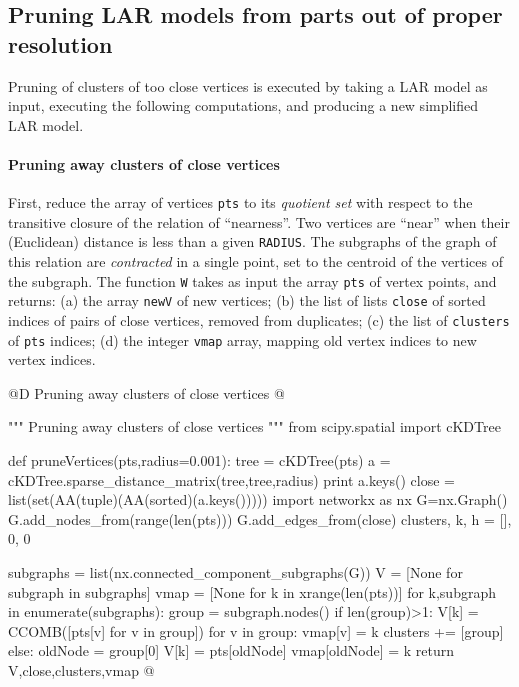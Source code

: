 \documentclass[11pt,oneside]{article}    %
\begin{document}
\subsection{Pruning LAR models from parts out of proper resolution}

Pruning of clusters of too close vertices is executed by taking a LAR model as input, 
executing the following computations, and producing a new simplified LAR model.

\paragraph{Pruning away clusters of close vertices}
First, reduce the array of vertices \texttt{pts} to its \emph{quotient set} with respect to the transitive closure of the relation of ``nearness''. Two vertices are ``near'' when their (Euclidean) distance is less than a given \texttt{RADIUS}. The subgraphs of the graph of this relation are \emph{contracted} in a single point, set to the centroid of the vertices of the subgraph. The function \texttt{W} takes as input the array \texttt{pts} of vertex points, and returns: (a) the array \texttt{newV} of new vertices; (b) the list of lists \texttt{close} of sorted indices of pairs of close vertices, removed from duplicates; (c) the list of \texttt{clusters} of \texttt{pts} indices; (d) the integer  \texttt{vmap} array, mapping old vertex indices to new vertex indices.

@D Pruning away clusters of close vertices
@{""" Pruning away clusters of close vertices """
from scipy.spatial import cKDTree

def pruneVertices(pts,radius=0.001):
    tree = cKDTree(pts)
    a = cKDTree.sparse_distance_matrix(tree,tree,radius)
    print a.keys()
    close = list(set(AA(tuple)(AA(sorted)(a.keys()))))
    import networkx as nx
    G=nx.Graph()
    G.add_nodes_from(range(len(pts)))
    G.add_edges_from(close)
    clusters, k, h = [], 0, 0
    
    subgraphs = list(nx.connected_component_subgraphs(G))
    V = [None for subgraph in subgraphs]
    vmap = [None for k in xrange(len(pts))]
    for k,subgraph in enumerate(subgraphs):
        group = subgraph.nodes()
        if len(group)>1: 
            V[k] = CCOMB([pts[v] for v in group])
            for v in group: vmap[v] = k
            clusters += [group]
        else: 
            oldNode = group[0]
            V[k] = pts[oldNode]
            vmap[oldNode] = k
    return V,close,clusters,vmap
@}
\end{document}

